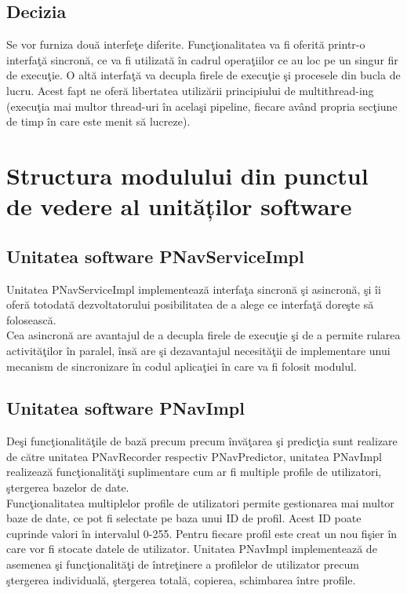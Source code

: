 	\subsection{Decizia}
	Se vor furniza două interfeţe diferite. Funcţionalitatea va fi oferită printr-o interfaţă sincronă, ce va fi utilizată în cadrul operaţiilor ce au loc pe un singur fir de execuţie. O altă interfaţă va decupla firele de execuţie şi procesele din bucla de lucru.
	Acest fapt ne oferă libertatea utilizării principiului de multithread-ing (execuţia mai multor thread-uri în acelaşi pipeline, fiecare având propria secţiune de timp în care este menit să lucreze).

\section{Structura modulului din punctul de vedere al unităților software} 

\subsection{Unitatea software PNavServiceImpl} 
Unitatea PNavServiceImpl implementează interfaţa sincronă şi asincronă, şi îi oferă totodată dezvoltatorului posibilitatea de a alege ce interfaţă doreşte să folosească.
\vspace{6pt}
\\Cea asincronă are avantajul de a decupla firele de execuţie şi de a permite rularea activităţilor în paralel, însă are şi dezavantajul necesităţii de implementare unui mecanism de sincronizare în codul aplicaţiei în care va fi folosit modulul.


\subsection{Unitatea software PNavImpl} 
Deşi funcţionalităţile de bază precum precum învăţarea şi predicţia sunt realizare de către unitatea PNavRecorder respectiv PNavPredictor, unitatea PNavImpl realizează funcţionalităţi suplimentare cum ar fi multiple profile de utilizatori, ştergerea bazelor de date.
\vspace{6pt}
\\Funcţionalitatea multiplelor profile de utilizatori permite gestionarea mai multor baze de date, ce pot fi selectate pe baza unui ID de profil.
Acest ID poate cuprinde valori în intervalul 0-255. Pentru fiecare profil este creat un nou fişier în care vor fi stocate datele de utilizator. Unitatea PNavImpl implementează de asemenea şi funcţionalităţi de întreţinere a profilelor de utilizator precum ştergerea individuală, ştergerea totală, copierea, schimbarea între profile.

